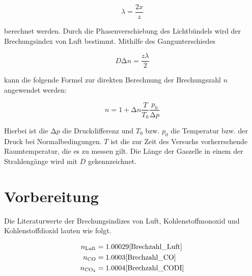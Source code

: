 \begin{equation}
\label{eqn:Laenge}
    \lambda = \frac{2x}{z}
\end{equation}

\noindent berechnet werden.
\newpage
\noindent Durch die Phasenverschiebung des Lichtbündels wird der Brechungsindex von Luft bestimmt. Mithilfe des Gangunterschiedes 

\begin{equation}
\label{eqn:delta_n}
    D\increment{}n = \frac{z\lambda}{2}
\end{equation}

\noindent kann die folgende Formel zur direkten Berechnung der Brechungszahl $n$ angewendet werden:

\begin{equation}
\label{eqn:Brechungsindex}
    n = 1 + \increment{}n\frac{T}{T_0}\frac{p_0}{\increment{}p}
\end{equation}

\noindent Hierbei ist die $\increment{}p$ die Druckdifferenz und $T_0$ bzw. $p_0$ die Temperatur bzw. der Druck bei Normalbedingungen.
$T$ ist die zur Zeit des Versuchs vorherrschende Raumtemperatur, die es zu messen gilt. Die Länge der Gaszelle in einem der Strahlengänge 
wird mit $D$ gekennzeichnet.
 
\section{Vorbereitung}

Die Literaturwerte der Brechungsindizes von Luft, Kohlenstoffmonoxid und Kohlenstoffdioxid lauten wie folgt.

\begin{align}
    n_\text{Luft} &= 1.00029\text{\cite{Brechzahl_Luft}}\\ 
    n_\text{CO} &= 1.0003\text{\cite{Brechzahl_CO}}\\ 
    n_\text{CO$_2$} &= 1.0004\text{\cite{Brechzahl_CODI}}\\
\end{align}

%